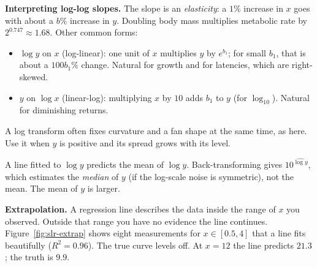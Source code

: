 \textbf{Interpreting log-log slopes.} The slope is an \emph{elasticity}: a
$1\%$ increase in $x$ goes with about a $b\%$ increase in $y$. Doubling body mass
multiplies metabolic rate by $2^{0.747} \approx 1.68$. Other common forms:
\begin{itemize}
  \item $\log y$ on $x$ (log-linear): one unit of $x$ multiplies $y$ by
  $e^{b_1}$; for small $b_1$, that is about a $100b_1\%$ change. Natural for
  growth and for latencies, which are right-skewed.
  \item $y$ on $\log x$ (linear-log): multiplying $x$ by $10$ adds
  $b_1$ to $y$ (for $\log_{10}$). Natural for diminishing returns.
\end{itemize}
A log transform often fixes curvature and a fan shape at the same time, as
here. Use it when $y$ is positive and its spread grows with its level.

\begin{trapbox}
A line fitted to $\log y$ predicts the mean of $\log y$. Back-transforming
gives $10^{\widehat{\log y}}$, which estimates the \emph{median} of $y$ (if the
log-scale noise is symmetric), not the mean. The mean of $y$ is larger.
\end{trapbox}

\textbf{Extrapolation.} A regression line describes the data inside the range
of $x$ you observed. Outside that range you have no evidence the line
continues. Figure~\ref{fig:slr-extrap} shows eight measurements for
$x\in[0.5,4]$ that a line fits beautifully ($R^2 = 0.96$). The true curve
levels off. At $x=12$ the line predicts $21.3$; the truth is $9.9$.

